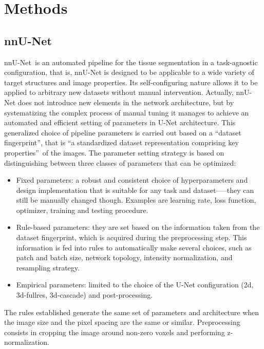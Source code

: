 \chapter{Methods} \label{chap:Methods}
\vspace{1cm}


\section{nnU-Net}
nnU-Net\,\cite{Isensee2021, nnUNet} is an automated pipeline for the tissue segmentation in a task-agnostic configuration, that is, nnU-Net is designed to be applicable to a wide variety of target structures and image properties. Its self-configuring nature allows it to be applied to arbitrary new datasets without manual intervention. Actually, nnU-Net does not introduce new elements in the network architecture, but by systematizing the complex process of manual tuning it manages to achieve an automated and efficient setting of parameters in U-Net architecture. This generalized choice of pipeline parameters is carried out based on a \enquote{dataset fingerprint}, that is \enquote{a standardized dataset representation comprising key properties}\,\cite{Isensee2021} of the images. The parameter setting strategy is based on distinguishing between three classes of parameters that can be optimized:
\begin{itemize}
    \item Fixed parameters: a robust and consistent choice of hyperparameters and design implementation that is suitable for any task and dataset—--they can still be manually changed though. Examples are learning rate, loss function, optimizer, training and testing procedure.
    \item Rule-based parameters: they are set based on the information taken from the dataset fingerprint, which is acquired during the preprocessing step. This information is fed into rules to automatically make several choices, such as patch and batch size, network topology, intensity normalization, and resampling strategy.
    \item Empirical parameters: limited to the choice of the U-Net configuration (2d, 3d-fullres, 3d-cascade) and post-processing.
\end{itemize}
The rules established generate the same set of parameters and architecture when the image size and the pixel spacing are the same or similar. Preprocessing consists in cropping the image around non-zero voxels and performing z-normalization.

